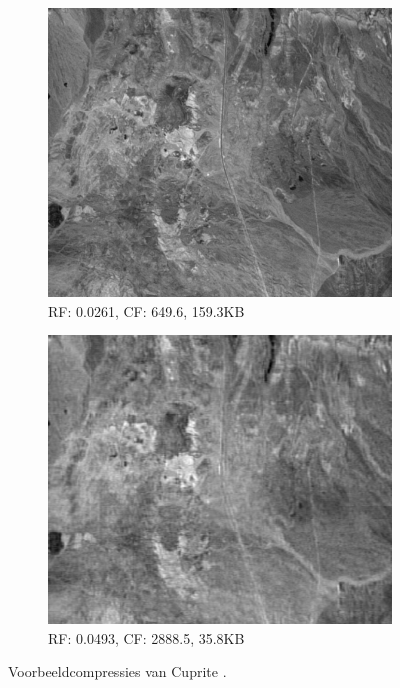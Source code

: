 \begin{figure}[]
\centering
\ContinuedFloat
\begin{subfigure}{\textwidth}
  \centering
  \includegraphics[scale=0.55]{images/example_compression_Cuprite_0_025.png}
  \caption{RF: 0.0261, CF: 649.6, 159.3KB}
\end{subfigure}
\begin{subfigure}{\textwidth}
  \centering
  \includegraphics[scale=0.55]{images/example_compression_Cuprite_0_05.png}
  \caption{RF: 0.0493, CF: 2888.5, 35.8KB}
\end{subfigure}
\caption{Voorbeeldcompressies van Cuprite \cite{ref:ehu_aviris_cuprite}.}
\end{figure}

